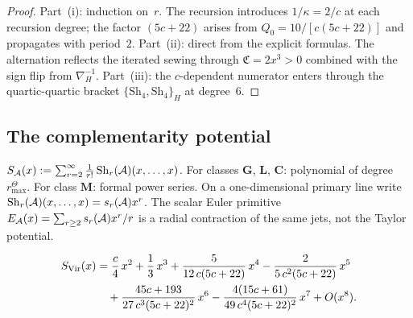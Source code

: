 \begin{proof}
Part~(i): induction on~$r$. The recursion introduces
$1/\kappa = 2/c$ at each recursion degree; the factor $(5c+22)$
arises from $Q_0 = 10/[c(5c+22)]$ and propagates with period~$2$.
Part~(ii): direct from the explicit formulas. The alternation
reflects the iterated sewing through $\mathfrak{C} = 2x^3 > 0$
combined with the sign flip from $\nabla_H^{-1}$.
Part~(iii): the $c$-dependent numerator enters through the
quartic-quartic bracket $\{\mathrm{Sh}_4,\mathrm{Sh}_4\}_H$
at degree~$6$.
\end{proof}



\subsection{The complementarity potential}

\begin{definition}
$S_{\mathcal{A}}(x) := \sum_{r=2}^{\infty} \frac{1}{r!}\,
\mathrm{Sh}_r(\mathcal{A})(x,\ldots,x)$.
For classes $\mathbf{G}$, $\mathbf{L}$, $\mathbf{C}$:
polynomial of degree \(r^\Theta_{\max}\).
For class $\mathbf{M}$: formal power series.
On a one-dimensional primary line write
$\mathrm{Sh}_r(\mathcal{A})(x,\ldots,x)=s_r(\mathcal{A})x^r$.
The scalar Euler primitive
$E_{\mathcal{A}}(x)=\sum_{r\geq 2}s_r(\mathcal{A})x^r/r$
is a radial contraction of the same jets, not the Taylor potential.
\end{definition}

\begin{theorem}
\ClaimStatusProvedHere
\begin{align}\label{eq:thqg-virasoro-potential-explicit}
S_{\mathrm{Vir}}(x)
&= \frac{c}{4}\,x^2
+ \frac{1}{3}\,x^3
+ \frac{5}{12\,c(5c+22)}\,x^4
- \frac{2}{5\,c^2(5c+22)}\,x^5
\notag\\
&\quad + \frac{45c+193}{27\,c^3(5c+22)^2}\,x^6
- \frac{4(15c+61)}{49\,c^4(5c+22)^2}\,x^7
+ O(x^8).
\end{align}
\end{theorem}

